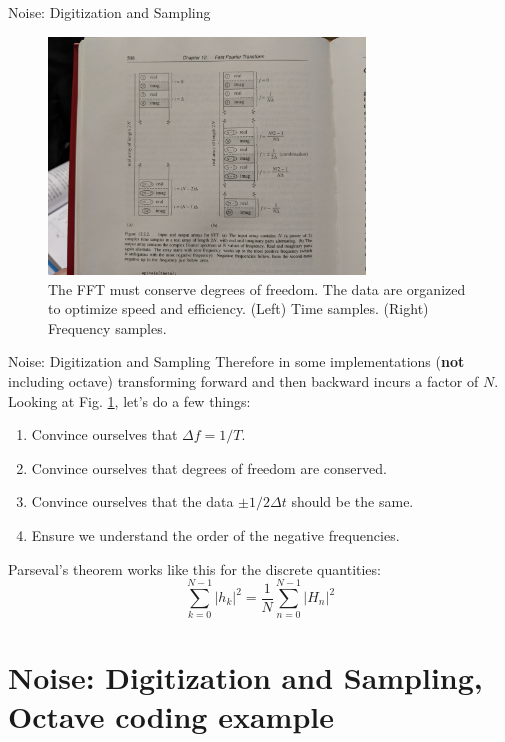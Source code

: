 \documentclass{beamer}
\begin{document}
\begin{frame}{Noise: Digitization and Sampling}
\begin{figure}
\centering
\includegraphics[width=0.75\textwidth,trim=21cm 25cm 18cm 12cm,clip=true]{figures/fft.jpg}
\caption{\label{fig:fft3} The FFT must conserve degrees of freedom.  The data are organized to optimize speed and efficiency.  (Left) Time samples. (Right) Frequency samples.}
\end{figure}
\end{frame}

\begin{frame}{Noise: Digitization and Sampling}
\small
Therefore in some implementations (\textbf{not} including octave) transforming forward and then backward incurs a factor of $N$. \\ \vspace{0.5cm}
Looking at Fig. \ref{fig:fft3}, let's do a few things:
\begin{enumerate}
\item Convince ourselves that $\Delta f = 1/T$.
\item Convince ourselves that degrees of freedom are conserved.
\item Convince ourselves that the data $\pm 1/2\Delta t$ should be the same.
\item Ensure we understand the order of the negative frequencies.
\end{enumerate}
Parseval's theorem works like this for the discrete quantities:
\begin{equation}
\sum_{k=0}^{N-1} |h_k|^2 = \frac{1}{N}\sum_{n=0}^{N-1} |H_n|^2
\end{equation}
\end{frame}

\section{Noise: Digitization and Sampling, Octave coding example}
\end{document}
